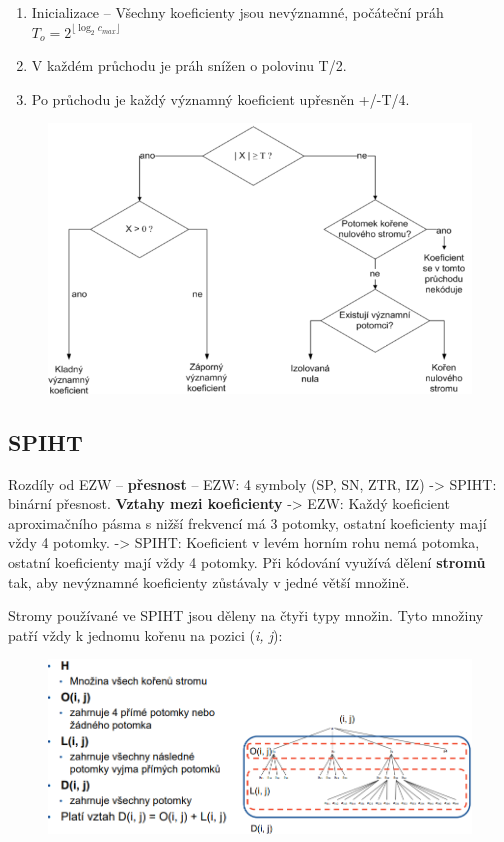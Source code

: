 \begin{enumerate}
    \item Inicializace -- Všechny koeficienty jsou nevýznamné, počáteční práh $T_o = 2^{\lfloor \log_2 c_{max} \rfloor}$
    \item V každém průchodu je práh snížen o polovinu T/2.
    \item Po průchodu je každý významný koeficient upřesněn +/-T/4.
\end{enumerate}

\begin{figure}[ht]
    \centering
    \includegraphics[width=0.6\linewidth]{images/ezw.png}
\end{figure}
\FloatBarrier


\subsection{SPIHT}

Rozdíly od EZW -- \textbf{přesnost} -- EZW: 4 symboly (SP, SN, ZTR, IZ) -> SPIHT: binární přesnost. \textbf{Vztahy mezi koeficienty} -> EZW: Každý koeficient aproximačního pásma s nižší frekvencí má 3 potomky, ostatní koeficienty mají vždy 4 potomky. -> SPIHT: Koeficient v levém horním rohu nemá potomka, ostatní koeficienty mají
vždy 4 potomky. Při kódování využívá dělení \textbf{stromů} tak, aby nevýznamné koeficienty zůstávaly v jedné větší množině.

Stromy používané ve SPIHT jsou děleny na čtyři typy množin. Tyto množiny patří
vždy k jednomu kořenu na pozici (\textit{i, j}):

\begin{figure}[ht]
    \centering
    \includegraphics[width=0.7\linewidth]{images/spiht.png}
\end{figure}
\FloatBarrier


